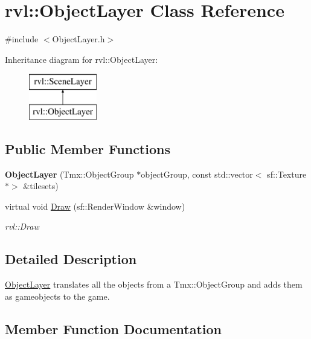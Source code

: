\hypertarget{classrvl_1_1_object_layer}{}\section{rvl\+:\+:Object\+Layer Class Reference}
\label{classrvl_1_1_object_layer}


{\ttfamily \#include $<$Object\+Layer.\+h$>$}

Inheritance diagram for rvl\+:\+:Object\+Layer\+:\begin{figure}[H]
\begin{center}
\leavevmode
\includegraphics[height=2.000000cm]{classrvl_1_1_object_layer}
\end{center}
\end{figure}
\subsection*{Public Member Functions}
\begin{DoxyCompactItemize}
\item 
\mbox{\label{classrvl_1_1_object_layer_a6d05cb33022f41cf32d866d6857bade5}} 
{\bfseries Object\+Layer} (Tmx\+::\+Object\+Group $\ast$object\+Group, const std\+::vector$<$ sf\+::\+Texture $\ast$$>$ \&tilesets)
\item 
virtual void \hyperlink{classrvl_1_1_object_layer_a3b29bd63ae4233eba84817bfe9eecae9}{Draw} (sf\+::\+Render\+Window \&window)
\begin{DoxyCompactList}\small\item\em rvl\+::\+Draw \end{DoxyCompactList}\end{DoxyCompactItemize}


\subsection{Detailed Description}
\hyperlink{classrvl_1_1_object_layer}{Object\+Layer} translates all the objects from a Tmx\+::\+Object\+Group and adds them as gameobjects to the game. 

\subsection{Member Function Documentation}
\mbox{\label{classrvl_1_1_object_layer_a3b29bd63ae4233eba84817bfe9eecae9}} 
